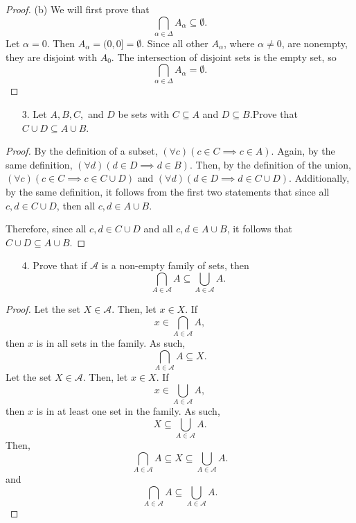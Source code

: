 \documentclass[10pt]{article}
\theoremstyle{definition}
\theoremstyle{definition}
\theoremstyle{plain}
\begin{document}
\begin{proof}{(b)}
We will first prove that
$$
\bigcap_{\alpha \in \Delta} A_\alpha \subseteq \emptyset.
$$
Let $\alpha=0$. Then $A_\alpha = (0,0] = \emptyset$. Since all other $A_\alpha$, where $\alpha\neq 0$, are nonempty, they are disjoint with $A_0$. The intersection of disjoint sets is the empty set, so
$$
\bigcap_{\alpha \in \Delta} A_\alpha = \emptyset.
$$
\end{proof}



\pagebreak



\begin{enumerate}
\item[3.] Let $A, B, C,$ and $D$ be sets with $C \subseteq A$ and $D \subseteq B$.Prove that $C \cup D \subseteq A \cup B$.
\end{enumerate}

\begin{proof}
By the definition of a subset, $(\forall c)(c\in C \implies c\in A)$. Again, by the same definition, $(\forall d) (d\in D \implies d\in B)$. Then, by the definition of the union, $(\forall c)(c\in C \implies c\in C\cup D)$ and $(\forall d)(d\in D\implies d\in C\cup D)$. Additionally, by the same definition, it follows from the first two statements that since all $c,d\in C\cup D$, then all $c,d \in A\cup B$.

\bigskip

\noindent Therefore, since all $c,d\in C\cup D$ and all $c,d \in A\cup B$, it follows that $C\cup D \subseteq A\cup B$.
\end{proof}



\pagebreak



\begin{enumerate}
\item[4.] Prove that if $\mathcal{A}$ is a non-empty family of sets, then $$\bigcap_{A \in \mathcal{A}}A \subseteq \bigcup_{A \in \mathcal{A}} A.$$
\end{enumerate}

\begin{proof}
Let the set $X\in\mathcal{A}$. Then, let $x\in X$. If 
$$
x\in \bigcap_{A \in \mathcal{A}}A,
$$
then $x$ is in all sets in the family. As such, 
$$
\bigcap_{A \in \mathcal{A}}A \subseteq X.
$$
Let the set $X\in\mathcal{A}$. Then, let $x\in X$. If
$$
x\in\bigcup_{A \in \mathcal{A}}A,
$$
then $x$ is in at least one set in the family. As such, 
$$
X \subseteq \bigcup_{A \in \mathcal{A}}A.
$$
Then, 
$$
\bigcap_{A \in \mathcal{A}}A \subseteq X \subseteq \bigcup_{A \in \mathcal{A}}A.
$$
and
$$
\bigcap_{A \in \mathcal{A}}A \subseteq \bigcup_{A \in \mathcal{A}}A.
$$
\end{proof}
\end{document}
